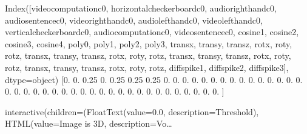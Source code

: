 \documentclass[letterpaper,10pt,english]{sphinxmanual}
\begin{document}
\begin{sphinxVerbatim}[commandchars=\\\{\}]
Index([\PYGZsq{}video\PYGZus{}computation\PYGZus{}c0\PYGZsq{}, \PYGZsq{}horizontal\PYGZus{}checkerboard\PYGZus{}c0\PYGZsq{},
       \PYGZsq{}audio\PYGZus{}right\PYGZus{}hand\PYGZus{}c0\PYGZsq{}, \PYGZsq{}audio\PYGZus{}sentence\PYGZus{}c0\PYGZsq{}, \PYGZsq{}video\PYGZus{}right\PYGZus{}hand\PYGZus{}c0\PYGZsq{},
       \PYGZsq{}audio\PYGZus{}left\PYGZus{}hand\PYGZus{}c0\PYGZsq{}, \PYGZsq{}video\PYGZus{}left\PYGZus{}hand\PYGZus{}c0\PYGZsq{}, \PYGZsq{}vertical\PYGZus{}checkerboard\PYGZus{}c0\PYGZsq{},
       \PYGZsq{}audio\PYGZus{}computation\PYGZus{}c0\PYGZsq{}, \PYGZsq{}video\PYGZus{}sentence\PYGZus{}c0\PYGZsq{}, \PYGZsq{}cosine\PYGZus{}1\PYGZsq{}, \PYGZsq{}cosine\PYGZus{}2\PYGZsq{},
       \PYGZsq{}cosine\PYGZus{}3\PYGZsq{}, \PYGZsq{}cosine\PYGZus{}4\PYGZsq{}, \PYGZsq{}poly\PYGZus{}0\PYGZsq{}, \PYGZsq{}poly\PYGZus{}1\PYGZsq{}, \PYGZsq{}poly\PYGZus{}2\PYGZsq{}, \PYGZsq{}poly\PYGZus{}3\PYGZsq{},
       \PYGZsq{}trans\PYGZus{}x\PYGZsq{}, \PYGZsq{}trans\PYGZus{}y\PYGZsq{}, \PYGZsq{}trans\PYGZus{}z\PYGZsq{}, \PYGZsq{}rot\PYGZus{}x\PYGZsq{}, \PYGZsq{}rot\PYGZus{}y\PYGZsq{}, \PYGZsq{}rot\PYGZus{}z\PYGZsq{}, \PYGZsq{}trans\PYGZus{}x\PYGZsq{},
       \PYGZsq{}trans\PYGZus{}y\PYGZsq{}, \PYGZsq{}trans\PYGZus{}z\PYGZsq{}, \PYGZsq{}rot\PYGZus{}x\PYGZsq{}, \PYGZsq{}rot\PYGZus{}y\PYGZsq{}, \PYGZsq{}rot\PYGZus{}z\PYGZsq{}, \PYGZsq{}trans\PYGZus{}x\PYGZsq{}, \PYGZsq{}trans\PYGZus{}y\PYGZsq{},
       \PYGZsq{}trans\PYGZus{}z\PYGZsq{}, \PYGZsq{}rot\PYGZus{}x\PYGZsq{}, \PYGZsq{}rot\PYGZus{}y\PYGZsq{}, \PYGZsq{}rot\PYGZus{}z\PYGZsq{}, \PYGZsq{}trans\PYGZus{}x\PYGZsq{}, \PYGZsq{}trans\PYGZus{}y\PYGZsq{}, \PYGZsq{}trans\PYGZus{}z\PYGZsq{},
       \PYGZsq{}rot\PYGZus{}x\PYGZsq{}, \PYGZsq{}rot\PYGZus{}y\PYGZsq{}, \PYGZsq{}rot\PYGZus{}z\PYGZsq{}, \PYGZsq{}diff\PYGZus{}spike1\PYGZsq{}, \PYGZsq{}diff\PYGZus{}spike2\PYGZsq{}, \PYGZsq{}diff\PYGZus{}spike3\PYGZsq{}],
      dtype=\PYGZsq{}object\PYGZsq{})
[0.   0.   0.25 0.   0.25 0.25 0.25 0.   0.   0.   0.   0.   0.   0.
 0.   0.   0.   0.   0.   0.   0.   0.   0.   0.   0.   0.   0.   0.
 0.   0.   0.   0.   0.   0.   0.   0.   0.   0.   0.   0.   0.   0.
 0.   0.   0.  ]
\end{sphinxVerbatim}

\begin{sphinxVerbatim}[commandchars=\\\{\}]
interactive(children=(FloatText(value=0.0, description=\PYGZsq{}Threshold\PYGZsq{}), HTML(value=\PYGZsq{}Image is 3D\PYGZsq{}, description=\PYGZsq{}Vo…
\end{sphinxVerbatim}
\end{document}
